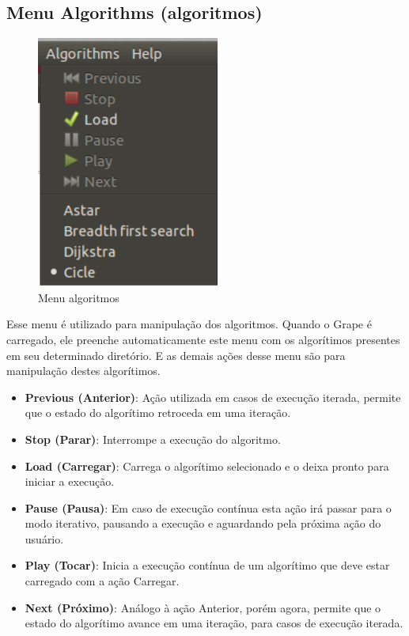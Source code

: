 \documentclass[a4paper]{abnt}
\begin{document}
\subsection{Menu Algorithms (algoritmos)}
\begin{figure}[htb]
    \centering
	\includegraphics[width=6cm]{grape_menu_algorithms.png}
	\caption{Menu algoritmos}
	\label{img_menu_algorithms}
\end{figure}

Esse menu é utilizado para manipulação dos algoritmos. Quando o Grape é carregado, ele preenche automaticamente este menu com os algorítimos presentes em seu determinado diretório. E as demais ações desse menu são para manipulação destes algorítimos.

\begin{itemize}
    \item \textbf{Previous (Anterior)}: Ação utilizada em casos de execução iterada, permite que o estado do algorítimo retroceda em uma iteração.
    \item \textbf{Stop (Parar)}: Interrompe a execução do algoritmo.
    \item \textbf{Load (Carregar)}: Carrega o algorítimo selecionado e o deixa pronto para iniciar a execução.
    \item \textbf{Pause (Pausa)}: Em caso de execução contínua esta ação irá passar para o modo iterativo, pausando a execução e aguardando pela próxima ação do usuário.
    \item \textbf{Play (Tocar)}: Inicia a execução contínua de um algorítimo que deve estar carregado com a ação Carregar.
    \item \textbf{Next (Próximo)}: Análogo à ação Anterior, porém agora, permite que o estado do algorítimo avance em uma iteração, para casos de execução iterada.
\end{itemize}
\end{document}
